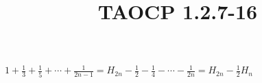 \documentclass{article}
\title{TAOCP 1.2.7\mbox{-}16}
\begin{document}
\maketitle

\( 1 + \frac{1}{3} + \frac{1}{5} + \cdots + \frac{1}{2n-1} = H_{2n} - \frac{1}{2} - \frac{1}{4} - \cdots - \frac{1}{2n} = H_{2n} - \frac{1}{2}H_{n} \)
\end{document}
